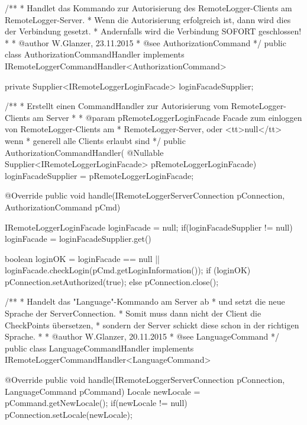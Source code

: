 \begin{spacing}{0.75}
	\begin{javacode}
/**
 * Handlet das Kommando zur Autorisierung des RemoteLogger-Clients am RemoteLogger-Server.
 * Wenn die Autorisierung erfolgreich ist, dann wird dies der Verbindung gesetzt.
 * Andernfalls wird die Verbindung SOFORT geschlossen!
 *
 * @author W.Glanzer, 23.11.2015
 * @see AuthorizationCommand
 */
public class AuthorizationCommandHandler implements 
  IRemoteLoggerCommandHandler<AuthorizationCommand>
{

  private Supplier<IRemoteLoggerLoginFacade> loginFacadeSupplier;

  /**
   * Erstellt einen CommandHandler zur Autorisierung vom RemoteLogger-Clients am Server
   *
   * @param pRemoteLoggerLoginFacade Facade zum einloggen von RemoteLogger-Clients am 
   *                                 RemoteLogger-Server, oder <tt>null</tt> wenn 
   *                                 generell alle Clients erlaubt sind
   */
  public AuthorizationCommandHandler(
    @Nullable Supplier<IRemoteLoggerLoginFacade> pRemoteLoggerLoginFacade)
  {
    loginFacadeSupplier = pRemoteLoggerLoginFacade;
  }

  @Override
  public void handle(IRemoteLoggerServerConnection pConnection, AuthorizationCommand pCmd)
  {
    IRemoteLoggerLoginFacade loginFacade = null;
    if(loginFacadeSupplier != null)
      loginFacade = loginFacadeSupplier.get()
    
    boolean loginOK = loginFacade == null || 
                        loginFacade.checkLogin(pCmd.getLoginInformation());
    if (loginOK)
      pConnection.setAuthorized(true);
    else
      pConnection.close();
  }

}\end{javacode}
\end{spacing}
\vspace{15px}
\begin{spacing}{0.75}
	\begin{javacode}
/**
 * Handelt das "Language"-Kommando am Server ab
 * und setzt die neue Sprache der ServerConnection.
 * Somit muss dann nicht der Client die CheckPoints übersetzen,
 * sondern der Server schickt diese schon in der richtigen Sprache.
 *
 * @author W.Glanzer, 20.11.2015
 * @see LanguageCommand
 */
public class LanguageCommandHandler 
  implements IRemoteLoggerCommandHandler<LanguageCommand>
{

  @Override
  public void handle(IRemoteLoggerServerConnection pConnection, LanguageCommand pCommand)
  {
    Locale newLocale = pCommand.getNewLocale();
    if(newLocale != null)
      pConnection.setLocale(newLocale);
  }

}\end{javacode}
\end{spacing}